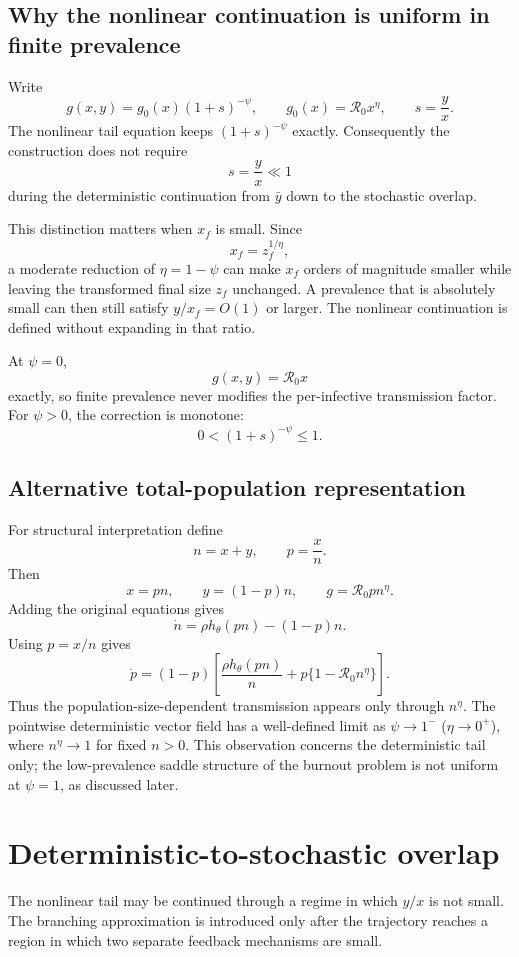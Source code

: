 \documentclass[11pt]{article}
\newcommand{\Rzero}{\mathcal R_0}
\newcommand{\hth}{h_\theta}
\newcommand{\xf}{x_f}
\newcommand{\gh}{g_0}
\begin{document}
\subsection{Why the nonlinear continuation is uniform in finite prevalence}
Write
\[
g(x,y)=\gh(x)(1+s)^{-\psi},
\qquad
\gh(x)=\Rzero x^\eta,
\qquad
s=\frac yx.
\]
The nonlinear tail equation keeps $(1+s)^{-\psi}$ exactly. Consequently the construction does not require
\[
s=\frac yx\ll1
\]
during the deterministic continuation from $\bar y$ down to the stochastic overlap.

This distinction matters when $\xf$ is small. Since
\[
\xf=z_f^{1/\eta},
\]
a moderate reduction of $\eta=1-\psi$ can make $\xf$ orders of magnitude smaller while leaving the transformed final size $z_f$ unchanged. A prevalence that is absolutely small can then still satisfy $y/\xf=O(1)$ or larger. The nonlinear continuation is defined without expanding in that ratio.

At $\psi=0$,
\[
g(x,y)=\Rzero x
\]
exactly, so finite prevalence never modifies the per-infective transmission factor. For $\psi>0$, the correction is monotone:
\[
0<(1+s)^{-\psi}\leq1.
\]

\subsection{Alternative total-population representation}
For structural interpretation define
\[
n=x+y,
\qquad
p=\frac xn.
\]
Then
\[
x=pn,
\qquad
y=(1-p)n,
\qquad
g=\Rzero p n^\eta.
\]
Adding the original equations gives
\[
\boxed{
\dot n=\rho\hth(pn)-(1-p)n.
}
\]
Using $p=x/n$ gives
\[
\boxed{
\dot p
=(1-p)
\left[
\frac{\rho\hth(pn)}{n}
+p\{1-\Rzero n^\eta\}
\right].
}
\]
Thus the population-size-dependent transmission appears only through $n^\eta$. The pointwise deterministic vector field has a well-defined limit as $\psi\to1^-$ ($\eta\to0^+$), where $n^\eta\to1$ for fixed $n>0$. This observation concerns the deterministic tail only; the low-prevalence saddle structure of the burnout problem is not uniform at $\psi=1$, as discussed later.

\section{Deterministic-to-stochastic overlap}
\label{sec:overlap}

The nonlinear tail may be continued through a regime in which $y/x$ is not small. The branching approximation is introduced only after the trajectory reaches a region in which two separate feedback mechanisms are small.
\end{document}
